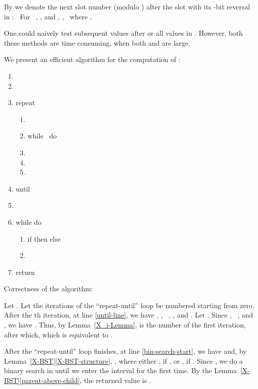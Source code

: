 \documentclass{article}
\newenvironment{enumeratealpha}{\begin{enumerate}[a{\textup{)}}] }{\end{enumerate}}
\newenvironment{enumeratenumeric}{\begin{enumerate}[1.] }{\end{enumerate}}
\begin{document}
By  we denote the next slot number (modulo )
after the slot  with its -bit reversal in : \ For \ , , and ,
, \
where .

One could naively test subsequent values after  or all values in
. However, both these methods are time consuming,
when both  and  are large.

We present an efficient algorithm for the computation of :
\begin{enumeratenumeric}
  \item 
  
  \item 
  
  \item \label{repeat-line}repeat
  \begin{enumeratealpha}
    \item 
    
    \item \label{internal-while}while  \ do \ 
    
    \item 
    
    \item 
    
    \item 
  \end{enumeratealpha}
  \item \label{until-line}until 
  
  \item \label{bin-search-start}
  
  \item \label{bin-search-while}while  do
  \begin{enumeratealpha}
    \item if  then  else 
    
    \item 
  \end{enumeratealpha}
  \item return 
\end{enumeratenumeric}


Correctness of the algorithm:

Let . Let the iterations of the ``repeat-until''
loop be numbered starting from zero. After the th iteration, at line
\ref{until-line}, we have , , \ , , and . Let . Since , \ ,
and , we have . Thus, by Lemma~\ref{X_i-Lemma},  is the number of the
first iteration, after which, which is equivalent to .

After the ``repeat-until'' loop finishes, at line \ref{bin-search-start}, we
have  and, by
Lemma~\ref{X-BST}\ref{X-BST-structure}, ,
where either , if , or , if . Since , we do a binary search in  until we enter the
interval  for the first time. By the
Lemma~\ref{X-BST}\ref{parent-above-child}, the returned value is .
\end{document}
